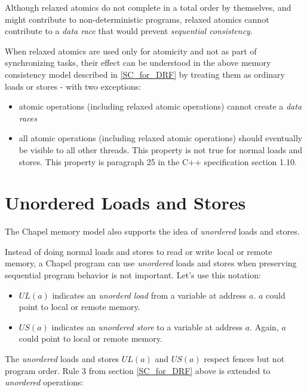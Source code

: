 Although relaxed atomics do not complete in a total order by themselves,
and might contribute to non-deterministic programs, relaxed atomics cannot
contribute to a \textit{data race} that would prevent \textit{sequential
consistency}.

When relaxed atomics are used only for atomicity and not as part of
synchronizing tasks, their effect can be understood in the above memory
consistency model described in \ref{SC_for_DRF} by treating them as
ordinary loads or stores - with two exceptions:

\begin{itemize}

\item atomic operations (including relaxed atomic operations) cannot
create a \textit{data races}

\item all atomic operations (including relaxed atomic operations) should
eventually be visible to all other threads. This property is not true for
normal loads and stores. This property is paragraph 25 in the C++
specification section 1.10.

\end{itemize}

\section{Unordered Loads and Stores}
The Chapel memory model also supports the idea of \textit{unordered} loads
and stores.

Instead of doing normal loads and stores to read or write local or remote
memory, a Chapel program can use \textit{unordered} loads and stores when
preserving sequential program behavior is not important. Let's use this
notation:

\begin{itemize}

  \item $UL(a)$ indicates an \textit{unorderd} \textit{load} from a
  variable at address $a$. $a$ could point to local or remote memory.

  \item $US(a)$ indicates an \textit{unordered} \textit{store} to a
  variable at address $a$. Again, $a$ could point to local or remote
  memory.

\end{itemize}

The \textit{unordered} loads and stores $UL(a)$ and $US(a)$ respect fences
but not program order. Rule 3 from section \ref{SC_for_DRF} above is
extended to \textit{unordered} operations:

